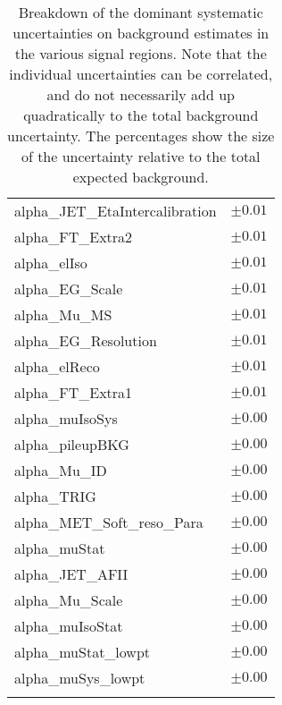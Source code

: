 \begin{table}
\begin{center}
\begin{tabular*}{\textwidth}{@{\extracolsep{\fill}}lc}
alpha\_JET\_EtaIntercalibration         & $\pm 0.01$       \\
alpha\_FT\_Extra2         & $\pm 0.01$       \\
alpha\_elIso         & $\pm 0.01$       \\
alpha\_EG\_Scale         & $\pm 0.01$       \\
alpha\_Mu\_MS         & $\pm 0.01$       \\
alpha\_EG\_Resolution         & $\pm 0.01$       \\
alpha\_elReco         & $\pm 0.01$       \\
alpha\_FT\_Extra1         & $\pm 0.01$       \\
alpha\_muIsoSys         & $\pm 0.00$       \\
alpha\_pileupBKG         & $\pm 0.00$       \\
alpha\_Mu\_ID         & $\pm 0.00$       \\
alpha\_TRIG         & $\pm 0.00$       \\
alpha\_MET\_Soft\_reso\_Para         & $\pm 0.00$       \\
alpha\_muStat         & $\pm 0.00$       \\
alpha\_JET\_AFII         & $\pm 0.00$       \\
alpha\_Mu\_Scale         & $\pm 0.00$       \\
alpha\_muIsoStat         & $\pm 0.00$       \\
alpha\_muStat\_lowpt         & $\pm 0.00$       \\
alpha\_muSys\_lowpt         & $\pm 0.00$       \\
\noalign{\smallskip}\hline\noalign{\smallskip}
\end{tabular*}
\end{center}
\caption[Breakdown of uncertainty on background estimates]{
Breakdown of the dominant systematic uncertainties on background estimates in the various signal regions.
Note that the individual uncertainties can be correlated, and do not necessarily add up quadratically to 
the total background uncertainty. The percentages show the size of the uncertainty relative to the total expected background.
\label{table.results.bkgestimate.uncertainties.SR3b1}}
\end{table}
\clearpage
%